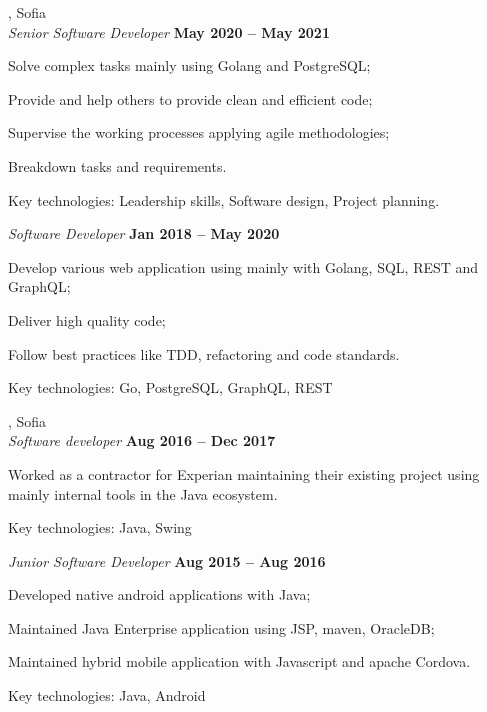 \documentclass[margin,line]{resume}
\begin{document}
\begin{resume}
    \textbf{}, Sofia \vspace{2mm}\\\vspace{1mm}%
    \textsl{Senior Software Developer} \hfill \textbf{May 2020 {--} May 2021}\
    \begin{list2}
        \item Solve complex tasks mainly using Golang and PostgreSQL;\@
        \item Provide and help others to provide clean and efficient code;
		\item Supervise the working processes applying agile methodologies;
        \item Breakdown tasks and requirements.
		\item Key technologies: Leadership skills, Software design, Project planning.
    \end{list2}

    \textsl{Software Developer} \hfill \textbf{Jan 2018 {--} May 2020}\
    \begin{list2}
        \item Develop various web application using mainly with
          Golang, SQL, REST and GraphQL;
		\item Deliver high quality code;\@
        \item Follow best practices like TDD, refactoring and code standards.\@
		\item Key technologies: Go, PostgreSQL, GraphQL, REST
    \end{list2}

    \textbf{}, Sofia \vspace{2mm}\\\vspace{1mm}%
    \textsl{Software developer} \hfill \textbf{Aug 2016 {--} Dec 2017}\
    \begin{list2}
        \item Worked as a contractor for Experian maintaining their
          existing project using mainly internal tools in the Java
          ecosystem.
		\item Key technologies: Java, Swing
    \end{list2}

    \textsl{Junior Software Developer} \hfill \textbf{Aug 2015 {--} Aug 2016}\
    \begin{list2}
        \item Developed native android applications with Java;
		\item Maintained Java Enterprise application using JSP, maven, OracleDB;\@
        \item Maintained hybrid mobile application with Javascript and apache Cordova.
		\item Key technologies: Java, Android
    \end{list2}


\end{resume}
\end{document}
